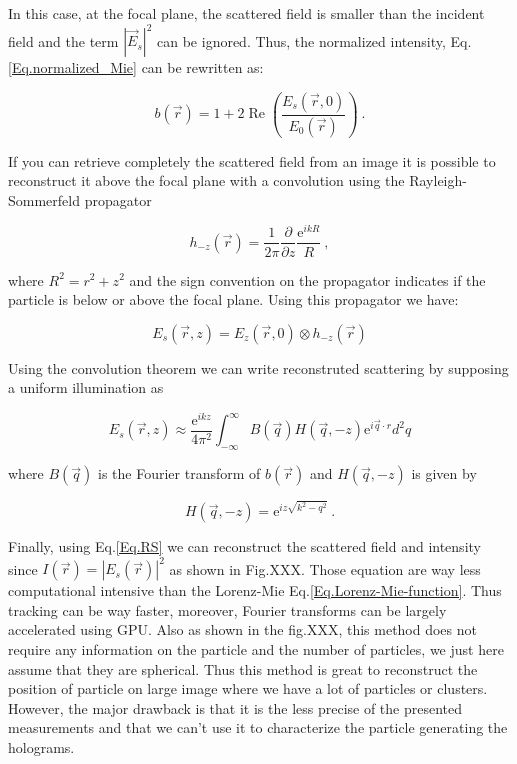 In this case, at the focal plane, the scattered field is smaller than the incident field and the term $|\vec{E}_s|^2$ can be ignored. Thus, the normalized intensity, Eq.\ref{Eq.normalized_Mie} can be rewritten as:

\begin{equation}
	b(\vec{r})= 1 + 2\operatorname{Re}\left( \frac{E_s(\vec{r},0)}{E_0(\vec{r})} \right) ~.
\end{equation}

If you can retrieve completely the scattered field from an image it is possible to reconstruct it above the focal plane with a convolution using the Rayleigh-Sommerfeld propagator \cite{goodman_introduction_2005}

\begin{equation}
	h_{-z}(\vec{r}) = \frac{1}{2 \pi} \frac{\partial}{\partial z} \frac{\mathrm{e}^{ikR}}{R} ~,
\end{equation}

where $ R^2 = r^2 + z^2 $ and the sign convention on the propagator indicates if the particle is below or above the focal plane. Using this propagator we have:

\begin{equation}
	E_s(\vec{r}, z) = E_z(\vec{r}, 0) \otimes h_{-z}(\vec{r})
\end{equation}

Using the convolution theorem \cite{cheong_strategies_2010, goodman_introduction_2005, sherman_application_1967,schnars_digital_1994} we can write reconstruted scattering by supposing a uniform illumination as 

\begin{equation}
	E_s(\vec{r}, z) \approx \frac{\mathrm{e}^{ikz}}{4\pi ^2}
	\int ^\infty _{- \infty}
	B(\vec{q}) H(\vec{q}, -z) \mathrm{e}^{i \vec{q} \cdot r} d^2 q
	\label{Eq.RS}
\end{equation}

where $B(\vec{q})$ is the Fourier transform of $b(\vec{r})$ and $H(\vec{q}, -z)$ is given by

\begin{equation}
	H(\vec{q}, -z) = \mathrm{e}^{iz \sqrt{k^2 - q^2}} ~.
\end{equation}

Finally, using Eq.\ref{Eq.RS} we can reconstruct the scattered field and intensity since $I(\vec{r}) = |E_s(\vec{r})|^2$ as shown in Fig.XXX. 
Those equation are way less computational intensive than the Lorenz-Mie Eq.\ref{Eq.Lorenz-Mie-function}. Thus tracking can be way faster, moreover, Fourier transforms can be largely accelerated using GPU. Also as shown in the fig.XXX, this method does not require any information on the particle and the number of particles, we just here assume that they are spherical. Thus this method is great to reconstruct the position of particle on large image where we have a lot of particles or clusters. However, the major drawback is that it is the less precise of the presented measurements and that we can't use it to characterize the particle generating the holograms.



